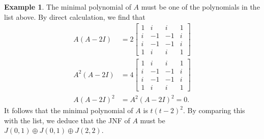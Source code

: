 \documentclass{amsart}
\newcommand{\bbm}       {\left[\begin{matrix}}
\newcommand{\ebm}       {\end{matrix}\right]}
\newcommand{\op}        {\oplus}
\renewcommand{\:}{\colon}
\theoremstyle{definition}
\newtheorem{example}[theorem]{Example}
\begin{document}
\begin{example}
 The minimal polynomial of $A$ must be one of the polynomials in the
 list above.  By direct calculation, we find that
 \begin{align*}
  A(A-2I)   &= 2 \bbm 1&i&i&1\\i&-1&-1&i\\i&-1&-1&i\\1&i&i&1\ebm \\
  A^2(A-2I) &= 4 \bbm 1&i&i&1\\i&-1&-1&i\\i&-1&-1&i\\1&i&i&1\ebm \\
  A(A-2I)^2 &= A^2(A-2I)^2 = 0.
 \end{align*}
 It follows that the minimal polynomial of $A$ is $t(t-2)^2$.  By
 comparing this with the list, we deduce that the JNF of $A$ must be
 $J(0,1)\op J(0,1)\op J(2,2)$.
\end{example}
\end{document}
